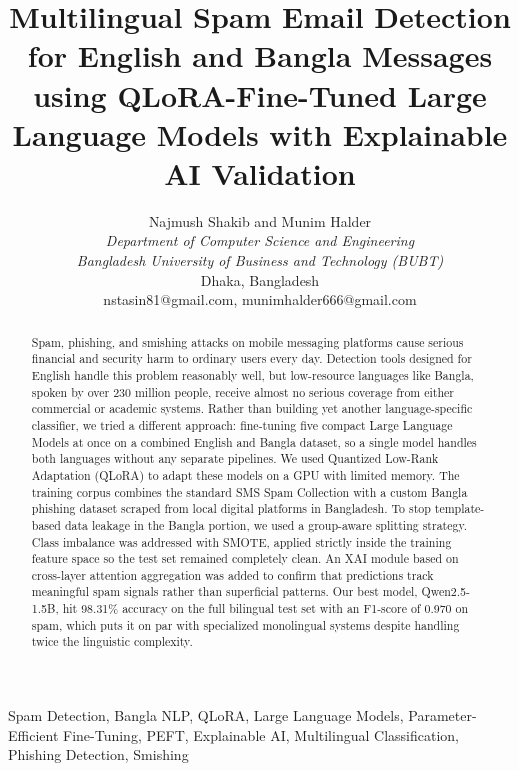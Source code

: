 \documentclass[journal]{IEEEtran}
\begin{document}
\frenchspacing

\title{Multilingual Spam Email Detection for English and Bangla Messages using QLoRA-Fine-Tuned Large Language Models with Explainable AI Validation}

\author{Najmush Shakib and Munim Halder \\
\textit{Department of Computer Science and Engineering} \\
\textit{Bangladesh University of Business and Technology (BUBT)} \\
Dhaka, Bangladesh \\
nstasin81@gmail.com, munimhalder666@gmail.com
}

\maketitle

\begin{abstract}
Spam, phishing, and smishing attacks on mobile messaging platforms cause serious financial and security harm to ordinary users every day. Detection tools designed for English handle this problem reasonably well, but low-resource languages like Bangla, spoken by over 230 million people, receive almost no serious coverage from either commercial or academic systems. Rather than building yet another language-specific classifier, we tried a different approach: fine-tuning five compact Large Language Models at once on a combined English and Bangla dataset, so a single model handles both languages without any separate pipelines. We used Quantized Low-Rank Adaptation (QLoRA) to adapt these models on a GPU with limited memory. The training corpus combines the standard SMS Spam Collection with a custom Bangla phishing dataset scraped from local digital platforms in Bangladesh. To stop template-based data leakage in the Bangla portion, we used a group-aware splitting strategy. Class imbalance was addressed with SMOTE, applied strictly inside the training feature space so the test set remained completely clean. An XAI module based on cross-layer attention aggregation was added to confirm that predictions track meaningful spam signals rather than superficial patterns. Our best model, Qwen2.5-1.5B, hit 98.31\% accuracy on the full bilingual test set with an F1-score of 0.970 on spam, which puts it on par with specialized monolingual systems despite handling twice the linguistic complexity.
\end{abstract}

\begin{IEEEkeywords}
Spam Detection, Bangla NLP, QLoRA, Large Language Models, Parameter-Efficient Fine-Tuning, PEFT, Explainable AI, Multilingual Classification, Phishing Detection, Smishing
\end{IEEEkeywords}
\end{document}
